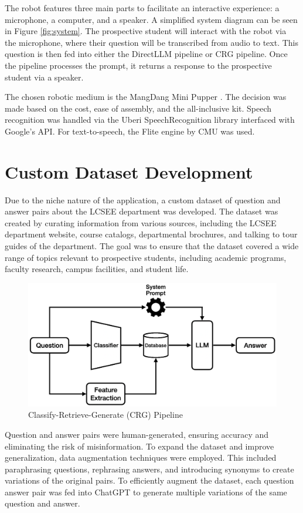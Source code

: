 \documentclass[conference]{IEEEtran}
\begin{document}
The robot features three main parts to facilitate an interactive experience: a microphone, a computer, and a speaker. 
A simplified system diagram can be seen in Figure \ref{fig:system}. The prospective student will interact with the robot via the microphone, where their question will be transcribed from audio to text.
This question is then fed into either the DirectLLM pipeline or CRG pipeline. Once the pipeline processes the prompt, it returns a response to the prospective student via a speaker.

The chosen robotic medium is the MangDang Mini Pupper \cite{b1}. 
The decision was made based on the cost, ease of assembly, and the all-inclusive kit.
Speech recognition was handled via the Uberi SpeechRecognition library interfaced with Google’s API.
For text-to-speech, the Flite engine by CMU was used.

\section{Custom Dataset Development}
Due to the niche nature of the application, a custom dataset of question and answer pairs about the LCSEE department was developed.
The dataset was created by curating information from various sources, including the LCSEE department website, course catalogs, departmental brochures, and talking to tour guides of the department. 
The goal was to ensure that the dataset covered a wide range of topics relevant to prospective students, including academic programs, faculty research, campus facilities, and student life.

\begin{figure}[t]
    \centering
    \includegraphics[width=0.60\linewidth]{assets/crg_diagram.png}
    \caption{Classify-Retrieve-Generate (CRG) Pipeline}
    \label{fig:crg_flow}
\end{figure}

Question and answer pairs were human-generated, ensuring accuracy and eliminating the risk of misinformation.
To expand the dataset and improve generalization, data augmentation techniques were employed.
This included paraphrasing questions, rephrasing answers, and introducing synonyms to create variations of the original pairs.
To efficiently augment the dataset, each question answer pair was fed into ChatGPT to generate multiple variations of the same question and answer.
\end{document}
